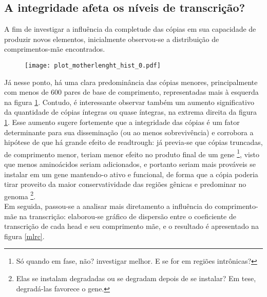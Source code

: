 \documentclass{article}
\begin{document}
\subsection{A integridade afeta os níveis de transcrição?}

A fim de investigar a influência da completude das cópias em sua capacidade de produzir novos elementos, inicialmente observou-se a distribuição de comprimentos-mãe encontrados.\\

\begin{figure}[h!]
  \label{mlhist}
  \centering
  \texttt{[image: plot\_motherlenght\_hist\_0.pdf]}
\end{figure}

Já nesse ponto, há uma clara predominância das cópias menores, principalmente com menos de 600 pares de base de comprimento, representadas mais à esquerda na figura \ref{mlhist}. Contudo, é interessante observar também um aumento significativo da quantidade de cópias íntegras ou quase íntegras, na extrema direita da figura \ref{mlhist}. Esse aumento sugere fortemente que a integridade das cópias é um fator determinante para sua disseminação (ou ao menos sobrevivência) e corrobora a hipótese de que há grande efeito de readtrough: já previa-se que cópias truncadas, de comprimento menor, teriam menor efeito no produto final de um gene \footnote{Só quando em fase, não? investigar melhor. E se for em regiões intrônicas?}, visto que menos aminoácidos seriam adicionados, e portanto seriam mais prováveis se instalar em um gene mantendo-o ativo e funcional, de forma que a cópia poderia tirar proveito da maior conservatividade das regiões gênicas e predominar no genoma \footnote{Elas se instalam degradadas ou se degradam depois de se instalar? Em tese, degradá-las favorece o gene.}.\\

Em seguida, passou-se a analisar mais diretamento a influência do comprimento-mãe na transcrição: elaborou-se gráfico de dispersão entre o coeficiente de transcrição de cada head e seu comprimento mãe, e o resultado é apresentado na figura \ref{mlrc}.
\end{document}
